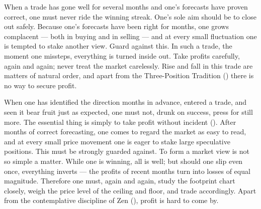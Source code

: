 

\begin{sokyubox}
{\small\itshape\color{sokyubar} }

\medskip
When a trade has gone well for several months and one's forecasts
have proven correct, one must never ride the winning streak. One's
sole aim should be to close out safely. Because one's forecasts
have been right for months, one grows complacent --- both in buying
and in selling --- and at every small fluctuation one is tempted to
stake another view. Guard against this. In such a trade, the moment
one missteps, everything is turned inside out. Take profits
carefully, again and again; never treat the market carelessly. Rise
and fall in this trade are matters of natural order, and apart from
the Three-Position Tradition () there is no
way to secure profit.
\end{sokyubox}

\commentary
When one has identified the direction months in advance, entered a
trade, and seen it bear fruit just as expected, one must not, drunk
on success, press for still more. The essential thing is simply to
take profit without incident (). After months of
correct forecasting, one comes to regard the market as easy to read,
and at every small price movement one is eager to stake large
speculative positions. This must be strongly guarded against. To
form a market view is not so simple a matter. While one is winning,
all is well; but should one slip even once, everything inverts ---
the profits of recent months turn into losses of equal magnitude.
Therefore one must, again and again, study the footprint chart
closely, weigh the price level of the ceiling and floor, and trade
accordingly. Apart from the contemplative discipline of Zen
(), profit is hard to come by.


